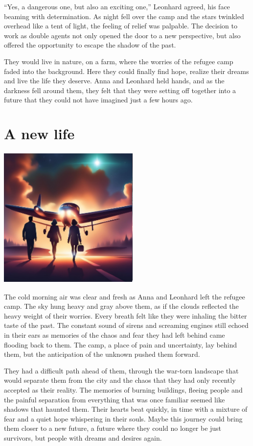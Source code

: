 \documentclass[
]{article}
\begin{document}
``Yes, a dangerous one, but also an exciting one,'' Leonhard agreed, his
face beaming with determination. As night fell over the camp and the
stars twinkled overhead like a tent of light, the feeling of relief was
palpable. The decision to work as double agents not only opened the door
to a new perspective, but also offered the opportunity to escape the
shadow of the past.

They would live in nature, on a farm, where the worries of the refugee
camp faded into the background. Here they could finally find hope,
realize their dreams and live the life they deserve. Anna and Leonhard
held hands, and as the darkness fell around them, they felt that they
were setting off together into a future that they could not have
imagined just a few hours ago.

\section{A new life}\label{a-new-life}

\includegraphics[width=2.73958in,height=2.77083in]{media/image7.png}

The cold morning air was clear and fresh as Anna and Leonhard left the
refugee camp. The sky hung heavy and gray above them, as if the clouds
reflected the heavy weight of their worries. Every breath felt like they
were inhaling the bitter taste of the past. The constant sound of sirens
and screaming engines still echoed in their ears as memories of the
chaos and fear they had left behind came flooding back to them. The
camp, a place of pain and uncertainty, lay behind them, but the
anticipation of the unknown pushed them forward.

They had a difficult path ahead of them, through the war-torn landscape
that would separate them from the city and the chaos that they had only
recently accepted as their reality. The memories of burning buildings,
fleeing people and the painful separation from everything that was once
familiar seemed like shadows that haunted them. Their hearts beat
quickly, in time with a mixture of fear and a quiet hope whispering in
their souls. Maybe this journey could bring them closer to a new future,
a future where they could no longer be just survivors, but people with
dreams and desires again.
\end{document}
